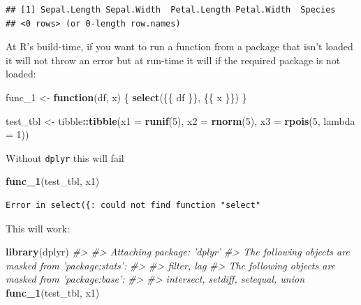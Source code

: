\documentclass[]{book}
\newenvironment{Shaded}{\begin{snugshade}}{\end{snugshade}}
\newcommand{\CommentTok}[1]{\textcolor[rgb]{0.56,0.35,0.01}{\textit{#1}}}
\newcommand{\ControlFlowTok}[1]{\textcolor[rgb]{0.13,0.29,0.53}{\textbf{#1}}}
\newcommand{\DataTypeTok}[1]{\textcolor[rgb]{0.13,0.29,0.53}{#1}}
\newcommand{\DecValTok}[1]{\textcolor[rgb]{0.00,0.00,0.81}{#1}}
\newcommand{\KeywordTok}[1]{\textcolor[rgb]{0.13,0.29,0.53}{\textbf{#1}}}
\newcommand{\NormalTok}[1]{#1}
\newcommand{\OperatorTok}[1]{\textcolor[rgb]{0.81,0.36,0.00}{\textbf{#1}}}
\newcommand{\StringTok}[1]{\textcolor[rgb]{0.31,0.60,0.02}{#1}}
\begin{document}
\begin{verbatim}
## [1] Sepal.Length Sepal.Width  Petal.Length Petal.Width  Species     
## <0 rows> (or 0-length row.names)
\end{verbatim}

At R's build-time, if you want to run a function from a package that isn't loaded it will not throw an error but at run-time it will if the required package is not loaded:

\begin{Shaded}
\begin{Highlighting}[]
\NormalTok{func_}\DecValTok{1}\NormalTok{ <-}\StringTok{ }\ControlFlowTok{function}\NormalTok{(df, x) \{}
  \KeywordTok{select}\NormalTok{(\{\{ df \}\}, \{\{ x \}\})}
\NormalTok{\}}

\NormalTok{test_tbl <-}\StringTok{ }\NormalTok{tibble}\OperatorTok{::}\KeywordTok{tibble}\NormalTok{(}\DataTypeTok{x1 =} \KeywordTok{runif}\NormalTok{(}\DecValTok{5}\NormalTok{),}
             \DataTypeTok{x2 =} \KeywordTok{rnorm}\NormalTok{(}\DecValTok{5}\NormalTok{),}
             \DataTypeTok{x3 =} \KeywordTok{rpois}\NormalTok{(}\DecValTok{5}\NormalTok{, }\DataTypeTok{lambda =} \DecValTok{1}\NormalTok{))}
\end{Highlighting}
\end{Shaded}

Without \texttt{dplyr} this will fail

\begin{Shaded}
\begin{Highlighting}[]
\KeywordTok{func_1}\NormalTok{(test_tbl, x1)}
\end{Highlighting}
\end{Shaded}

\begin{verbatim}
Error in select({: could not find function "select"
\end{verbatim}

This will work:

\begin{Shaded}
\begin{Highlighting}[]
\KeywordTok{library}\NormalTok{(dplyr)}
\CommentTok{#> }
\CommentTok{#> Attaching package: 'dplyr'}
\CommentTok{#> The following objects are masked from 'package:stats':}
\CommentTok{#> }
\CommentTok{#>     filter, lag}
\CommentTok{#> The following objects are masked from 'package:base':}
\CommentTok{#> }
\CommentTok{#>     intersect, setdiff, setequal, union}
\KeywordTok{func_1}\NormalTok{(test_tbl, x1)}
\end{Highlighting}
\end{Shaded}
\end{document}
